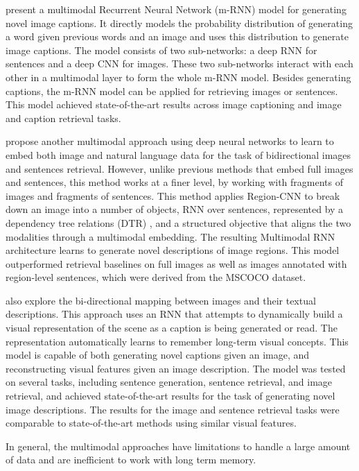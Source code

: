 \citet{Mao2014, Mao2015_mRNN} present a multimodal Recurrent Neural Network (m-RNN) model for generating novel image captions. It directly models the probability distribution of generating a word given previous words and an image and uses this distribution to generate image captions. The model consists of two sub-networks: a deep RNN for sentences and a deep CNN for images. These two sub-networks interact with each other in a multimodal layer to form the whole m-RNN model. Besides generating captions, the m-RNN model can be applied for retrieving images or sentences. This model achieved state-of-the-art results across image captioning and image and caption retrieval tasks.

\citet{Karpathy2015} propose another multimodal approach using deep neural networks to learn to embed both image and natural language data for the task of bidirectional images and sentences retrieval. However, unlike previous methods that embed full images and sentences, this method works at a finer level, by working with fragments of images and fragments of sentences. This method applies Region-CNN to break down an image into a number of objects, RNN over sentences, represented by a dependency tree relations (DTR) \citep{DeMarneffe2006}, and a structured objective that aligns the two modalities through a multimodal embedding. The resulting Multimodal RNN architecture learns to generate novel descriptions of image regions. This model outperformed retrieval baselines on full images as well as images annotated with region-level sentences, which were derived from the MSCOCO dataset.
 
\citet{Chen2015} also explore the bi-directional mapping between images and their textual descriptions. This approach uses an RNN that attempts to dynamically build a visual representation of the scene as a caption is being generated or read. The representation automatically learns to remember long-term visual concepts. This model is capable of both generating novel captions given an image, and reconstructing visual features given an image description. The model was tested on several tasks, including sentence generation, sentence retrieval, and image retrieval, and achieved state-of-the-art results for the task of generating novel image descriptions. The results for the image and sentence retrieval tasks were comparable to state-of-the-art methods using similar visual features.

In general, the multimodal approaches have limitations to handle a large amount of data and are inefficient to work with long term memory.

